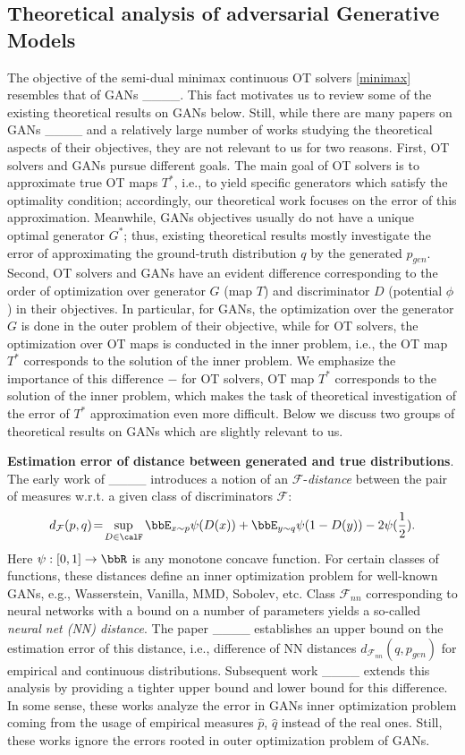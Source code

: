\subsection{Theoretical analysis of adversarial Generative Models}\label{subsec:works-gans}
The objective of the semi-dual minimax continuous OT solvers \eqref{minimax} resembles that of GANs ____. This fact motivates us to review some of the existing theoretical results on GANs below. Still, while there are many papers on GANs ____ and a relatively large number of works studying the theoretical aspects of their objectives, they are not relevant to us for two reasons. First, OT solvers and GANs pursue different goals. The main goal of OT solvers is to approximate true OT maps $T^*$, i.e., to yield specific generators which satisfy the optimality condition; accordingly, our theoretical work focuses on the error of this approximation. Meanwhile, GANs objectives usually do not have a unique optimal generator $G^*$; thus, existing theoretical results mostly investigate the error of approximating the ground-truth distribution $q$ by the generated $p_{gen}$. Second, OT solvers and GANs have an evident difference corresponding to the order of 
optimization over generator $G$ (map $T$) and discriminator $D$ (potential $\phi$) in their objectives. In particular, for GANs, the optimization over the generator $G$ is done in the outer problem of their objective, while for OT solvers, the optimization over OT maps is conducted in the inner problem, i.e., the OT map $T^*$ corresponds to the solution of the inner problem. We emphasize the importance of this difference $-$ for OT solvers, OT map $T^*$ corresponds to the solution of the inner problem, which makes the task of theoretical investigation of the error of $T^*$ approximation even more difficult.
Below we discuss two groups of theoretical results on GANs which are slightly relevant to us.


\textbf{Estimation error of distance between generated and true distributions}. The early work of ____ introduces a notion of an $\mathcal{F}$-\textit{distance}
between the pair of measures w.r.t. a given class of discriminators $\mathcal{F}$:
$$
d_{\mathcal{F}}(p,q)\!=\! \sup_{D\in \calF} \bbE_{x\sim p} \psi(D(x)) + \bbE_{y\sim q} \psi(1-D(y))-2\psi(\frac{1}{2}).
$$
Here $\psi:[0,1]\rightarrow\bbR$ is any monotone concave function.
For certain classes of functions, these distances define an inner optimization problem for well-known GANs, e.g., Wasserstein, Vanilla, MMD, Sobolev, etc. Class $\mathcal{F}_{nn}$ corresponding to neural networks with a bound on a number of parameters yields a so-called \textit{neural net (NN) distance}. 
The paper ____ establishes an upper bound on the estimation error of this distance, i.e., difference of NN distances $d_{\mathcal{F}_{nn}}(q, p_{gen})$ for empirical and continuous distributions. Subsequent work ____ extends this analysis by providing a tighter upper bound and lower bound for this difference. In some sense, these works analyze the error in GANs inner optimization problem coming from the usage of empirical measures $\widehat{p}$, $\widehat{q}$ instead of the real ones.
Still, these works ignore the errors rooted in outer optimization problem of GANs. 

